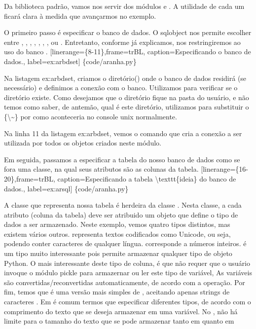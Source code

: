 \documentclass[a4paper,10pt,portuguese]{sphinxmanual}
\begin{document}
Da biblioteca padrão, vamos nos servir dos módulos
 e . A utilidade de cada um
ficará clara à medida que avançarmos no exemplo.

O primeiro passo é especificar o banco de dados. O sqlobject nos
permite escolher entre , , ,
, , , , ou .
Entretanto, conforme já explicamos, nos restringiremos ao uso do
banco .
{[}linerange=\{8-11\},frame=trBL, caption=Especificando o banco de dados., label=ex:arbdset{]} \{code/aranha.py\}

Na listagem ex:arbdset, criamos o diretório() onde o
banco de dados residirá (se necessário) e definimos a conexão com o
banco. Utilizamos  para verificar se o diretório
existe. Como desejamos que o diretório fique na pasta do usuário, e
não temos como saber, de antemão, qual é este diretório, utilizamos
 para substituir o \{\textbackslash{}\textasciitilde{}\} por
 como aconteceria no console unix normalmente.

Na linha 11 da listagem ex:arbdset, vemos o comando que cria a
conexão a ser utilizada por todos os objetos criados neste módulo.

Em seguida, passamos a especificar a tabela do nosso banco de dados
como se fora uma classe, na qual seus atributos são as colunas da
tabela.
{[}linerange=\{16-20\},frame=trBL, caption=Especificando a tabela \textbackslash{}texttt\{ideia\} do banco de dados., label=ex:arsql{]} \{code/aranha.py\}

A classe que representa nossa tabela é herdeira da classe
. Nesta classe, a cada atributo (coluna da tabela)
deve ser atribuido um objeto que define o tipo de dados a ser
armazenado. Neste exemplo, vemos quatro tipos distintos, mas
existem vários outros.  representa textos codificados
como Unicode, ou seja, podendo conter caracteres de qualquer
língua.  corresponde a números inteiros.  é
um tipo muito interessante pois permite armazenar qualquer tipo de
objeto Python. O mais interessante deste tipo de coluna, é que não
requer que o usuário invoque o módulo pickle para armazernar ou ler
este tipo de variável, As variáveis são convertidas/reconvertidas
automaticamente, de acordo com a operação. Por fim, temos
 que é uma versão mais simples de ,
aceitando apenas strings de caracteres . Em  é
comum termos que especificar diferentes tipos, de acordo com o
comprimento do texto que se deseja armazenar em uma variável. No
, não há limite para o tamanho do texto que se pode
armazenar tanto em  quanto em 
\end{document}
